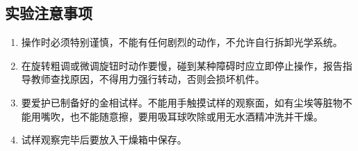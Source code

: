 \documentclass[a4paper,utf8]{article}
\begin{document}
    \subsection{实验注意事项}
        \begin{enumerate}
            \item 操作时必须特别谨慎，不能有任何剧烈的动作，不允许自行拆卸光学系统。
            \item 在旋转粗调或微调旋钮时动作要慢，碰到某种障碍时应立即停止操作，报告指导教师查找原因，不得用力强行转动，否则会损坏机件。
            \item 要爱护已制备好的金相试样。不能用手触摸试样的观察面，如有尘埃等脏物不能用嘴吹，也不能随意擦，要用吸耳球吹除或用无水酒精冲洗并干燥。
            \item 试样观察完毕后要放入干燥箱中保存。
        \end{enumerate}
\end{document}
